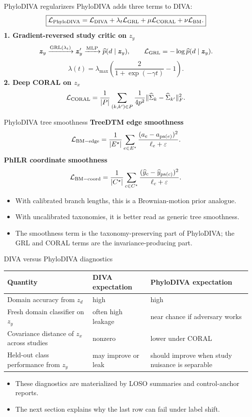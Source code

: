 \documentclass[aspectratio=169,10pt]{beamer}
\begin{document}
\begin{frame}{PhyloDIVA regularizers}
\small
PhyloDIVA adds three terms to DIVA:
\[
\boxed{
\mathcal L_{\rm PhyloDIVA}
=
\mathcal L_{\rm DIVA}
+\lambda_t\mathcal L_{\rm GRL}
+\mu\mathcal L_{\rm CORAL}
+\nu\mathcal L_{\rm BM}.
}
\]
\textbf{1. Gradient-reversed study critic on \(z_y\)}
\[
\bm z_y \xrightarrow{\operatorname{GRL}(\lambda_t)} \bm z_y'
\xrightarrow{\text{MLP}} \widehat p(d\mid\bm z_y),
\qquad
\mathcal L_{\rm GRL}=-\log\widehat p(d\mid\bm z_y).
\]
\[
\lambda(t)=\lambda_{\max}\left(\frac{2}{1+\exp(-\gamma t)}-1\right).
\]
\textbf{2. Deep CORAL on \(z_x\)}
\[
\mathcal L_{\rm CORAL}
=\frac{1}{|P|}\sum_{(k,k')\in P}\frac{1}{4p^2}
\|\widehat\Sigma_k-\widehat\Sigma_{k'}\|_F^2.
\]
\end{frame}

\begin{frame}{PhyloDIVA tree smoothness}
\small
\textbf{TreeDTM edge smoothness}
\[
\mathcal L_{\rm BM-edge}
=
\frac{1}{|E^\star|}
\sum_{e\in E^\star}
\frac{(a_e-a_{\operatorname{pa}(e)})^2}{\ell_e+\varepsilon}.
\]
\textbf{PhILR coordinate smoothness}
\[
\mathcal L_{\rm BM-coord}
=
\frac{1}{|C^\star|}
\sum_{c\in C^\star}
\frac{(\widehat y_c-\widehat y_{\operatorname{pa}(c)})^2}{\ell_c+\varepsilon}.
\]
\begin{itemize}
  \item With calibrated branch lengths, this is a Brownian-motion prior analogue.
  \item With uncalibrated taxonomies, it is better read as generic tree smoothness.
  \item The smoothness term is the taxonomy-preserving part of PhyloDIVA; the GRL and CORAL terms are the invariance-producing part.
\end{itemize}
\end{frame}

\begin{frame}{DIVA versus PhyloDIVA diagnostics}
\small
\begin{tabular}{p{}p{}p{}}
\toprule
Quantity & DIVA expectation & PhyloDIVA expectation \\
\midrule
Domain accuracy from \(z_d\) & high & high \\
Fresh domain classifier on \(z_y\) & often high leakage & near chance if adversary works \\
Covariance distance of \(z_x\) across studies & nonzero & lower under CORAL \\
Held-out class performance from \(z_y\) & may improve or leak & should improve when study nuisance is separable \\
\bottomrule
\end{tabular}
\vspace{2mm}
\begin{itemize}
  \item These diagnostics are materialized by LOSO summaries and control-anchor reports.
  \item The next section explains why the last row can fail under label shift.
\end{itemize}
\end{frame}
\end{document}
